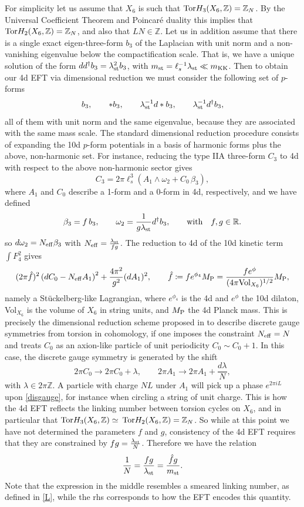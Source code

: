 \documentclass[11pt]{article}
\def\b {\beta}
\def\be{\begin{equation}}
\def\ee{\end{equation}}
\def\om{\omega}
\newcommand{\IR}{\mathbb{R}}
\newcommand{\IZ}{\mathbb{Z}}
\begin{document}
For simplicity let us assume that $X_6$ is such that ${\rm Tor}H_3(X_6,\IZ) =\IZ_N$. By the Universal Coefficient Theorem \cite{Bott1982DifferentialFI} and Poincar\'e duality this implies that ${\rm Tor}H_2(X_6,\IZ) =\IZ_N$, and also that $LN \in \IZ$. Let us in addition assume that there is a single exact eigen-three-form $b_3$ of the Laplacian with unit norm and a non-vanishing eigenvalue below the compactification scale. That is, we have a unique solution of the form $dd^{\dag} b_3 = \lambda_{\rm st}^2 b_3$, with $m_{\rm st} = \ell_s^{-1}\lambda_{\rm st} \ll m_{\rm KK}$. Then to obtain our 4d EFT via dimensional reduction we must consider the following set of $p$-forms
\be
b_3 , \qquad *b_3, \qquad  \lambda_{\rm st}^{-1} d* b_3,  \qquad \lambda_{\rm st}^{-1} d^\dag b_3 ,
\label{massivepforms}
\ee
all of them with unit norm and the same eigenvalue, because they are associated with the same mass scale. The standard dimensional reduction procedure consists of expanding the 10d $p$-form potentials in a basis of harmonic forms plus the above, non-harmonic set. For instance, reducing the type IIA three-form $C_3$ to 4d with respect to the above non-harmonic sector gives 
\be
C_3 = 2\pi  \ell_s^{3}  \left(A_1 \wedge \om_2 +  C_0 \, \b_3 \right) ,
\label{C3sing}
\ee
where $A_1$ and $C_0$ describe a 1-form and a 0-form in 4d, respectively, and we have defined
\be
\b_3 = f\, b_3 , \qquad \om_2 =  \frac{1}{g \lambda_{\rm st}} d^\dag b_3 , \qquad \text{with} \quad f, g \in \IR .
\label{alom}
\ee
so $d\om_2 = N_{\rm eff} \b_3$ with $N_{\rm eff} = \frac{\lambda_{\rm st}}{fg}$. The reduction to 4d of the 10d kinetic term $\int F_4^2$ gives
\be
(2\pi  \hat{f})^2 \left( dC_0 - N_{\rm eff} A_1 \right)^2 + \frac{4\pi^2}{g^{2}} (dA_1)^2 , \qquad \hat{f} \coloneqq  f e^{\phi_4} M_{\rm P} = \frac{f e^{\phi}}{(4\pi{\rm Vol}_{X_6})^{1/2}} M_{\rm P}  ,
\label{stuck}
\ee
namely a St\"uckelberg-like Lagrangian, where $e^{\phi_4}$ is the 4d and $e^{\phi}$ the 10d dilaton, Vol$_{X_6}$ is the volume of $X_6$ in string units, and $M_{\rm P}$ the 4d Planck mass. This is precisely the dimensional reduction scheme proposed in \cite{Camara:2011jg} to describe discrete gauge symmetries from torsion in cohomology, if one imposes the constraint $N_{\rm eff} = N$ and treats $C_0$ as an axion-like particle of unit periodicity $C_0 \sim C_0 +1$. In this case, the discrete gauge symmetry is generated by the shift
\be
2\pi C_0 \to 2\pi C_0 +\lambda , \qquad 2\pi A_1 \to  2\pi A_1 +  \frac{d\lambda}{N} ,
\label{disgauge}
\ee
with $\lambda \in 2\pi \IZ$. A particle with charge $NL$ under $A_1$ will pick up a phase $e^{2\pi i L}$ upon \eqref{disgauge}, for instance when circling a string of unit charge. This is how the 4d EFT reflects the linking number between torsion cycles on $X_6$, and in particular that ${\rm Tor} H_3(X_6,\IZ) \simeq $ ${\rm Tor} H_2(X_6,\IZ) =\IZ_N$. So while at this point we have not determined the parameters $f$ and $g$, consistency of the 4d EFT requires that they are constrained by $fg = \frac{\lambda_{\rm st}}{N}$. Therefore we have the relation
\be
\frac{1}{N} = \frac{fg}{\lambda_{\rm st}} = \frac{\hat{f}g}{m_{\rm st}} .
\label{Lphys}
\ee
Note that the expression in the middle resembles a smeared linking number, as defined in \eqref{L}, while the rhs corresponds to how the EFT encodes this quantity.
\end{document}
